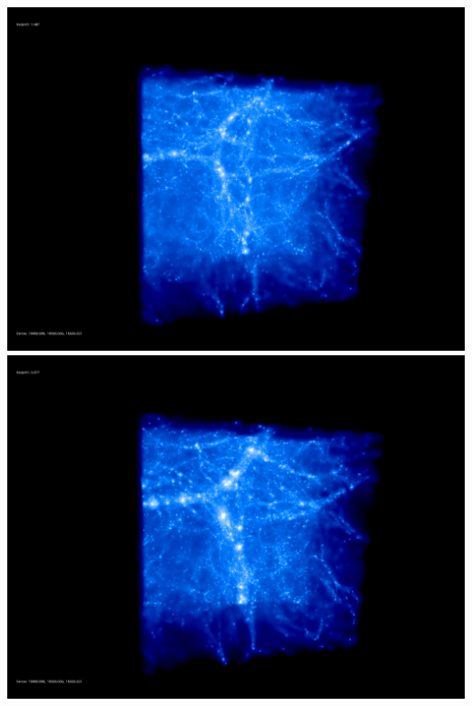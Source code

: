 \includegraphics[scale=0.1]{r256/stages_50/50.jpg} 
\includegraphics[scale=0.1]{r256/stages_50/100.jpg}  \\

